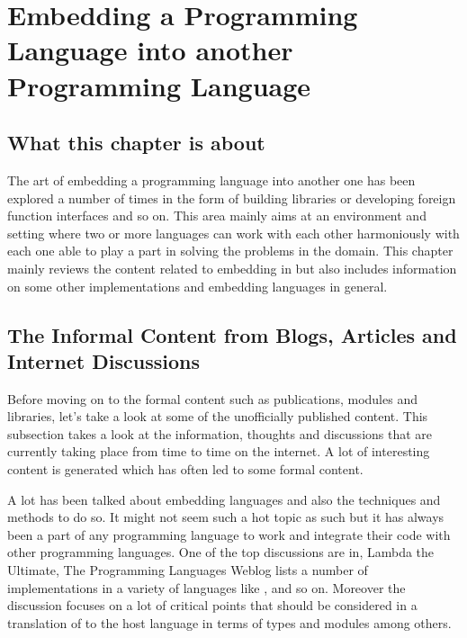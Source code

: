 \documentclass[thesis-solanki.tex]{subfiles}
\begin{document}
\chapter{Embedding a Programming Language into another Programming Language }\label{chap:embedding}


\section{What this chapter is about}

The art of embedding a programming language into another one has been explored a number of times in the form of
building libraries or developing foreign function interfaces and so on.
This area mainly aims at an environment and setting where two or more languages can work with each other
harmoniously with each one able to play a part in solving the problems in the domain.
This chapter mainly reviews the content related to embedding  in  but also
includes information on some other implementations and embedding languages in general.


\section{The Informal Content from Blogs, Articles and Internet Discussions}

Before moving on to the formal content such as publications, modules and libraries, let's take a look
at some of the unofficially published content.
This subsection takes a look at the information, thoughts and discussions that are currently taking place from time
to time on the internet.
A lot of interesting content is generated which has often led to some formal content.

A lot has been talked about embedding languages and also the techniques and methods to do so.
It might not seem such a hot topic as such but it has always been a part of any programming language to work and
integrate their code with other programming languages.
One of the top discussions are in, Lambda the Ultimate, The Programming Languages Weblog
\cite{website:lambda-the-ultimate} lists a number of  implementations in a variety of languages
like ,  \cite{racklog} and so on.
Moreover the discussion focuses on a lot of critical points that should be considered in a translation of
 to the host language in terms of types and modules among others.
\end{document}
